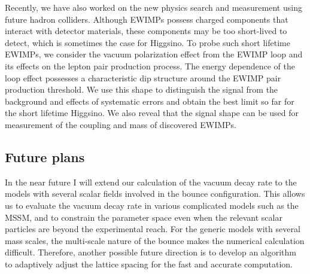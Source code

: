 \documentclass[12pt,notitlepage]{book}
\def\rem#1{ {\bf\textcolor{red}{($\clubsuit$ #1 $\clubsuit$)}}}
\begin{document}
Recently, we have also worked on the new physics search and measurement
using future hadron colliders.  Although EWIMPs possess charged
components that interact with detector materials, these components may
be too short-lived to detect, which is sometimes the case for Higgsino.
To probe such short lifetime EWIMPs, we consider the vacuum polarization
effect from the EWIMP loop and its effects on the lepton pair production
process.  The energy dependence of the loop effect possesses a
characteristic dip structure around the EWIMP pair production threshold.
We use this shape to distinguish the signal from the background and
effects of systematic errors and obtain the best limit so far for the
short lifetime Higgsino.  We also reveal that the signal shape can be
used for measurement of the coupling and mass of discovered EWIMPs.





\vspace*{-2mm}
\subsection*{Future plans}

In the near future I will extend our calculation of the vacuum decay
rate to the models with several scalar fields involved in the bounce
configuration.  This allows us to evaluate the vacuum decay rate in
various complicated models such as the MSSM, and to constrain the
parameter space even when the relevant scalar particles are beyond the
experimental reach.  For the generic models with several mass scales,
the multi-scale nature of the bounce makes the numerical calculation
difficult.  Therefore, another possible future direction is to develop
an algorithm to adaptively adjust the lattice spacing for the fast and
accurate computation.
\end{document}
